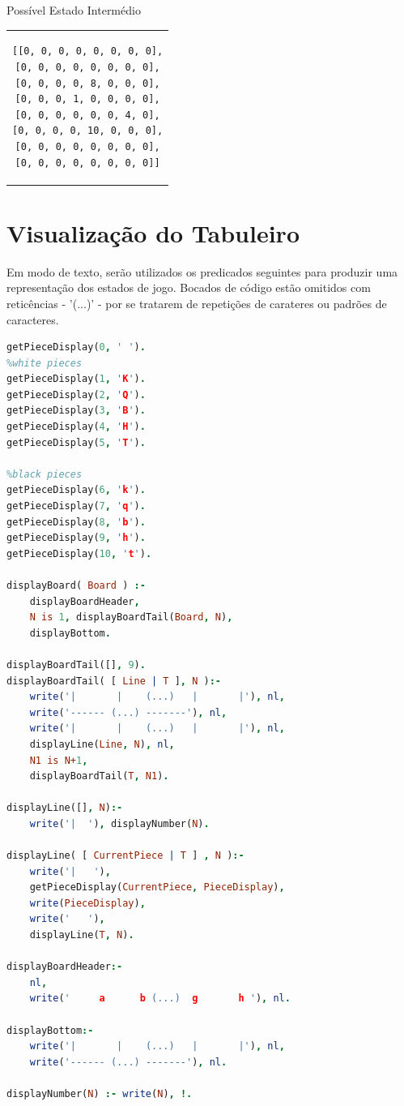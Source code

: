 \documentclass[a4paper]{article}
\begin{document}
\large Possível Estado Intermédio
\begin{center}
\begin{tabular}{c}
\begin{lstlisting}
[[0, 0, 0, 0, 0, 0, 0, 0],
[0, 0, 0, 0, 0, 0, 0, 0],
[0, 0, 0, 0, 8, 0, 0, 0],
[0, 0, 0, 1, 0, 0, 0, 0],
[0, 0, 0, 0, 0, 0, 4, 0],
[0, 0, 0, 0, 10, 0, 0, 0],
[0, 0, 0, 0, 0, 0, 0, 0],
[0, 0, 0, 0, 0, 0, 0, 0]]
\end{lstlisting}
\end{tabular}
\end{center}


\section{Visualização do Tabuleiro}

Em modo de texto, serão utilizados os predicados seguintes para produzir uma representação dos estados de jogo. Bocados de código estão omitidos com reticências - '(...)' - por se tratarem de repetições de carateres ou padrões de caracteres.\linebreak

\begin{lstlisting}[language=Prolog]
getPieceDisplay(0, ' ').
%white pieces
getPieceDisplay(1, 'K').
getPieceDisplay(2, 'Q'). 
getPieceDisplay(3, 'B'). 
getPieceDisplay(4, 'H'). 
getPieceDisplay(5, 'T').

%black pieces
getPieceDisplay(6, 'k'). 
getPieceDisplay(7, 'q').
getPieceDisplay(8, 'b'). 
getPieceDisplay(9, 'h').
getPieceDisplay(10, 't').

displayBoard( Board ) :-
	displayBoardHeader,
	N is 1, displayBoardTail(Board, N),
	displayBottom.

displayBoardTail([], 9).
displayBoardTail( [ Line | T ], N ):-
	write('|       |    (...)   |       |'), nl,
	write('------ (...) -------'), nl,
	write('|       |    (...)   |       |'), nl,
	displayLine(Line, N), nl,
	N1 is N+1,
	displayBoardTail(T, N1).

displayLine([], N):- 
	write('|  '), displayNumber(N).

displayLine( [ CurrentPiece | T ] , N ):-
	write('|   '),
	getPieceDisplay(CurrentPiece, PieceDisplay),
	write(PieceDisplay),
	write('   '),
	displayLine(T, N).

displayBoardHeader:- 
	nl,
	write('     a      b (...)  g       h '), nl.

displayBottom:-
	write('|       |    (...)   |       |'), nl,
	write('------ (...) -------'), nl.

displayNumber(N) :- write(N), !.
\end{lstlisting}
\end{document}

